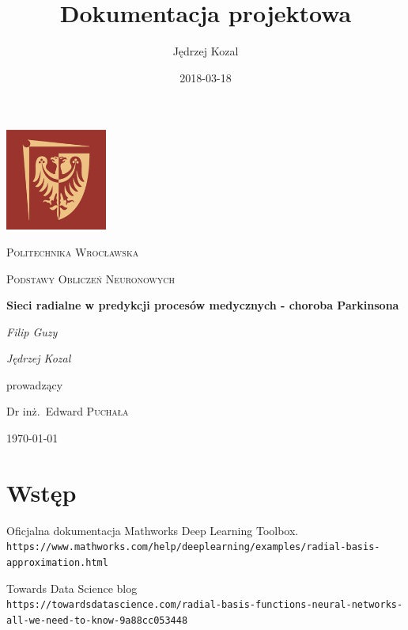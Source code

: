 \documentclass{article}
\title{Dokumentacja projektowa}
\date{2018-03-18}
\author{Jędrzej Kozal}
\begin{document}
\begin{titlepage}
	\centering
	\includegraphics[width=0.25\textwidth]{logo_pol_wroclaw.png}\par\vspace{1cm}
	{\scshape\LARGE Politechnika Wrocławska \par}
	\vspace{1cm}
	{\scshape\Large Podstawy Obliczeń Neuronowych\par}
	\vspace{1.5cm}
	{\huge\bfseries Sieci radialne w predykcji procesów medycznych - choroba Parkinsona \par}
	\vspace{2cm}
	{\Large\itshape Filip Guzy\par}
	{\Large\itshape Jędrzej Kozal\par}

	\vfill
	prowadzący\par
	Dr inż.~Edward \textsc{Puchała}

	\vfill

	{\large \today\par}
\end{titlepage}

\tableofcontents
\newpage


\section{Wstęp}


\newpage
\begin{thebibliography}{9}

Oficjalna dokumentacja Mathworks Deep Learning Toolbox. 
\\\texttt{https://www.mathworks.com/help/deeplearning/examples/radial-basis-approximation.html}

Towards Data Science blog
\\\texttt{https://towardsdatascience.com/radial-basis-functions-neural-networks-all-we-need-to-know-9a88cc053448}


\end{thebibliography}
\newpage

\listoffigures
\newpage
\end{document}
